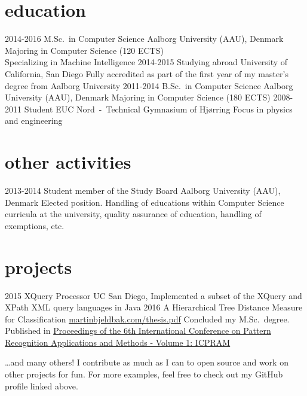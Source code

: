 \documentclass{afriggeri-cv/friggeri-cv}
\newcommand{\aau}{%
  Aalborg University (AAU), Denmark
}
\begin{document}
\section{education}

\begin{entrylist}
  \entry
    {2014-2016}
    {M.Sc.\ {\normalfont in Computer Science}}
    {\aau}
    {Majoring in Computer Science (120 ECTS)\\
    Specializing in Machine Intelligence}
  \entry
    {2014-2015}
    {Studying abroad}
    {University of California, San Diego}
    {Fully accredited as part of the first year of my master's degree from Aalborg University}
  \entry
    {2011-2014}
    {B.Sc.\ {\normalfont in Computer Science}}
    {\aau}
    {Majoring in Computer Science (180 ECTS)}
  \entry
    {2008-2011}
    {Student}
    {EUC Nord~-~Technical Gymnasium of Hjørring}
    {Focus in physics and engineering}
\end{entrylist}

\section{other activities}
\begin{entrylist}
  \entry
    {2013-2014}
    {Student member of the Study Board}
    {\aau}
    {Elected position. Handling of educations within Computer Science curricula at the university, quality assurance of education, handling of exemptions, etc.}
\end{entrylist}

\section{projects}
\begin{entrylist}
  \entry
    {2015}
    {XQuery Processor}
    {UC San Diego, }
    {Implemented a subset of the XQuery and XPath XML query languages in Java}
  \entry
    {2016}
    {A Hierarchical Tree Distance Measure for Classification}
    {\href{http://martinbjeldbak.com/thesis.pdf}{martinbjeldbak.com/thesis.pdf}}
    {Concluded my M.Sc.\ degree. Published in \href{http://www.scitepress.org/DigitalLibrary/PublicationsDetail.aspx?ID=xSe8tY7QfHE=&t=1}{Proceedings of the 6th International Conference on Pattern Recognition Applications and Methods - Volume 1: ICPRAM}}
\end{entrylist}

\dots and many others! I contribute as much as I can to open source and work on other projects for fun. For more examples, feel free to check out my GitHub profile linked above.
\end{document}

